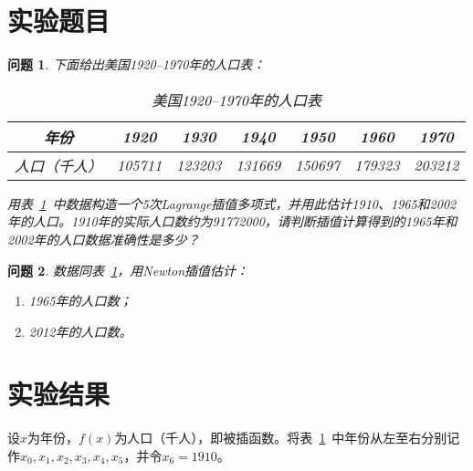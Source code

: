 \documentclass[degree=report, output=electronic]{ustcthesis}
\begin{document}
\maketitle

\frontmatter

\tableofcontents

\mainmatter

\newtheorem{problem}{问题}

\section{实验题目}

\begin{problem}
下面给出美国\numrange{1920}{1970}年的人口表：

\begin{table}[h]
  \centering
  \caption{美国\numrange{1920}{1970}年的人口表}
  \label{tab:ori-data}
  \begin{tabular}{c*{6}{c}}
    \toprule
    年份         & 1920   & 1930   & 1940   & 1950   & 1960   & 1970   \\
    \midrule
    人口（千人） & 105711 & 123203 & 131669 & 150697 & 179323 & 203212 \\
    \bottomrule
  \end{tabular}
\end{table}

用表~\ref{tab:ori-data}~中数据构造一个5次Lagrange插值多项式，并用此估计1910、1965和2002年的人口。1910年的实际人口数约为91772000，请判断插值计算得到的1965年和2002年的人口数据准确性是多少？
\end{problem}

\begin{problem}
数据同表~\ref{tab:ori-data}，用Newton插值估计：

\begin{enumerate}[align=left,label=（\arabic*）]
  \item 1965年的人口数；
  \item 2012年的人口数。
\end{enumerate}

\end{problem}

\section{实验结果}

设$x$为年份，$f(x)$为人口（千人），即被插函数。将表~\ref{tab:ori-data}~中年份从左至右分别记作$x_0,x_1,x_2,x_3,x_4,x_5$，并令$x_6=1910$。
\end{document}
